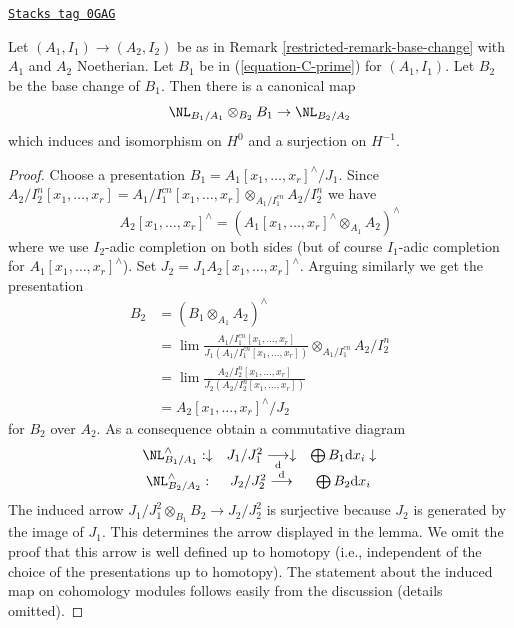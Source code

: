 \begin{lemma}
\label{restricted-lemma-NL-base-change}
\href{https://stacks.math.columbia.edu/tag/0GAG}{\texttt{Stacks tag 0GAG}}

Let $(A_1, I_1) \to (A_2, I_2)$ be as in
Remark \ref{restricted-remark-base-change} with $A_1$ and $A_2$ Noetherian.
Let $B_1$ be in (\ref{equation-C-prime}) for $(A_1, I_1)$.
Let $B_2$ be the base change of $B_1$. Then there is a canonical map
$$
\NL_{B_1/A_1} \otimes_{B_2} B_1 \to \NL_{B_2/A_2}
$$
which induces and isomorphism on $H^0$ and a surjection on $H^{-1}$.
\end{lemma}

\begin{proof}
Choose a presentation $B_1 = A_1[x_1, \ldots, x_r]^\wedge/J_1$.
Since
$A_2/I_2^n[x_1, \ldots, x_r] =
A_1/I_1^{cn}[x_1, \ldots, x_r] \otimes_{A_1/I_1^{cn}} A_2/I_2^n$
we have
$$
A_2[x_1, \ldots, x_r]^\wedge =
(A_1[x_1, \ldots, x_r]^\wedge \otimes_{A_1} A_2)^\wedge
$$
where we use $I_2$-adic completion on both sides (but of course
$I_1$-adic completion for $A_1[x_1, \ldots, x_r]^\wedge$).
Set $J_2 = J_1 A_2[x_1, \ldots, x_r]^\wedge$. Arguing similarly
we get the presentation
\begin{align*}
B_2
& =
(B_1 \otimes_{A_1} A_2)^\wedge \\
& =
\lim \frac{A_1/I_1^{cn}[x_1, \ldots, x_r]}{J_1(A_1/I_1^{cn}[x_1, \ldots, x_r])}
\otimes_{A_1/I_1^{cn}} A_2/I_2^n \\
& =
\lim \frac{A_2/I_2^n[x_1, \ldots, x_r]}{J_2(A_2/I_2^n[x_1, \ldots, x_r])} \\
& =
A_2[x_1, \ldots, x_r]^\wedge/J_2
\end{align*}
for $B_2$ over $A_2$. As a consequence obtain a commutative diagram
$$
\begin{array}{ccc}\NL^\wedge_{B_1/A_1} : \downarrow & J_1/J_1^2 \underset{\text{d}}{\longrightarrow}\downarrow & \bigoplus B_1\text{d}x_i \downarrow \\ \NL^\wedge_{B_2/A_2} : & J_2/J_2^2 \overset{\text{d}}{\longrightarrow} & \bigoplus B_2\text{d}x_i\end{array}
$$
The induced arrow $J_1/J_1^2 \otimes_{B_1} B_2 \to J_2/J_2^2$
is surjective because $J_2$ is generated by the image of $J_1$.
This determines the arrow displayed in the lemma. We omit the proof
that this arrow is well defined up to homotopy (i.e., independent
of the choice of the presentations up to homotopy). The statement
about the induced map on cohomology modules follows easily
from the discussion (details omitted).
\end{proof}

